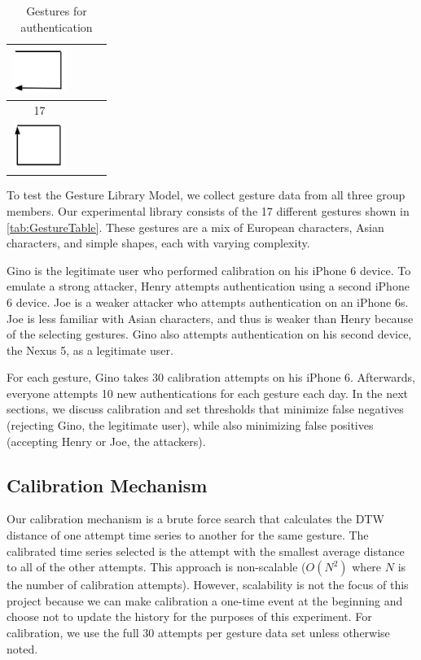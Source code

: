 \begin{table}
\begin{center}
\begin{tabular}{ c | c | c | c  }
    \includegraphics[width=0.2\linewidth, height=15mm]{./figures/gesture_16.png}  \\ \hline
    17    \\ \hline
    \includegraphics[width=0.2\linewidth, height=15mm]{./figures/gesture_17.png} \\ \hline
  \end{tabular}
\end{center}
\caption{Gestures for authentication} %
\label{table:GestureTable}
\end{table}


To test the Gesture Library Model, we collect gesture data from all three group members. Our experimental library consists of the 17 different gestures shown in \autoref{tab:GestureTable}. These gestures are a mix of European characters, Asian characters, and simple shapes, each with varying complexity. 

Gino is the legitimate user who performed calibration on his iPhone 6 device. To emulate a strong attacker, Henry attempts authentication using a second iPhone 6 device. Joe is a weaker attacker who attempts authentication on an iPhone 6s. Joe is less familiar with Asian characters, and thus is weaker than Henry because of the selecting gestures. Gino also attempts authentication on his second device, the Nexus 5, as a legitimate user.

For each gesture, Gino takes 30 calibration attempts on his iPhone 6. Afterwards, everyone attempts 10 new authentications for each gesture each day. In the next sections, we discuss calibration and set thresholds that minimize false negatives (rejecting Gino, the legitimate user), while also minimizing false positives (accepting Henry or Joe, the attackers).

\subsection{Calibration Mechanism}

Our calibration mechanism is a brute force search that calculates the \gls{DTW} distance of one attempt time series to another for the same gesture. The calibrated time series selected is the attempt with the smallest average distance to all of the other attempts. This approach is non-scalable ($O(N^{2})$ where $N$ is the number of calibration attempts). However, scalability is not the focus of this project because we can make calibration a one-time event at the beginning and choose not to update the history for the purposes of this experiment. For calibration, we use the full 30 attempts per gesture data set unless otherwise noted.


